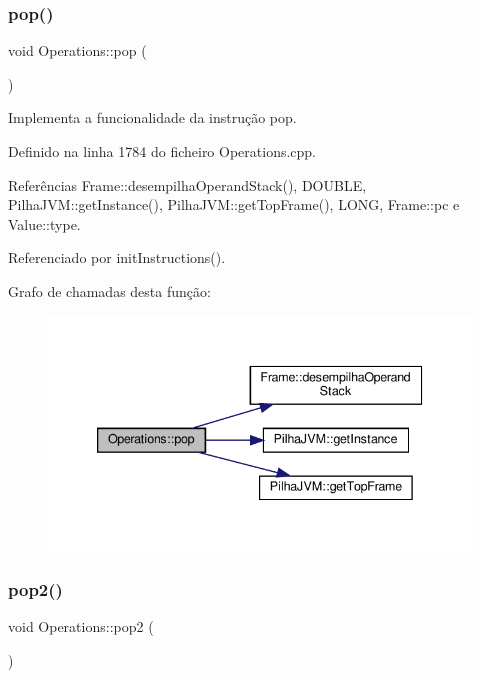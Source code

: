 \mbox{\label{classOperations_a30b8a646cbfac3712f4b339364bd31b1}} 
\subsubsection{\texorpdfstring{pop()}{pop()}}
{\footnotesize\ttfamily void Operations\+::pop (\begin{DoxyParamCaption}{ }\end{DoxyParamCaption})\hspace{0.3cm}{\ttfamily [private]}}



Implementa a funcionalidade da instrução pop. 



Definido na linha 1784 do ficheiro Operations.\+cpp.



Referências Frame\+::desempilha\+Operand\+Stack(), D\+O\+U\+B\+LE, Pilha\+J\+V\+M\+::get\+Instance(), Pilha\+J\+V\+M\+::get\+Top\+Frame(), L\+O\+NG, Frame\+::pc e Value\+::type.



Referenciado por init\+Instructions().

Grafo de chamadas desta função\+:\nopagebreak
\begin{figure}[H]
\begin{center}
\leavevmode
\includegraphics[width=339pt]{classOperations_a30b8a646cbfac3712f4b339364bd31b1_cgraph}
\end{center}
\end{figure}
\mbox{\label{classOperations_a54e578f7f27df39f8c516ec93195e219}} 
\subsubsection{\texorpdfstring{pop2()}{pop2()}}
{\footnotesize\ttfamily void Operations\+::pop2 (\begin{DoxyParamCaption}{ }\end{DoxyParamCaption})\hspace{0.3cm}{\ttfamily [private]}}



